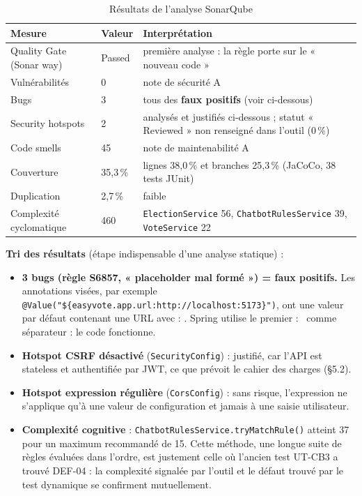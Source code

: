 \documentclass[12pt,a4paper]{report}
\begin{document}
\begin{table}[H]
\centering
\caption{Résultats de l'analyse SonarQube}
\small
\begin{tabularx}{\textwidth}{@{}p{4.4cm}p{2.6cm}X@{}}
\toprule
\rowcolor{evlight}\textbf{Mesure} & \textbf{Valeur} & \textbf{Interprétation}\\
\midrule
Quality Gate (Sonar way) & Passed & première analyse : la règle porte sur le « nouveau code »\\
Vulnérabilités & 0 & note de sécurité A\\
Bugs & 3 & tous des \textbf{faux positifs} (voir ci-dessous)\\
Security hotspots & 2 & analysés et justifiés ci-dessous ; statut « Reviewed » non renseigné dans l'outil (0\,\%)\\
Code smells & 45 & note de maintenabilité A\\
Couverture & 35,3\,\% & lignes 38,0\,\% et branches 25,3\,\% (JaCoCo, 38 tests JUnit)\\
Duplication & 2,7\,\% & faible\\
Complexité cyclomatique & 460 & \texttt{ElectionService} 56, \texttt{ChatbotRulesService} 39, \texttt{VoteService} 22\\
\bottomrule
\end{tabularx}
\end{table}

\textbf{Tri des résultats} (étape indispensable d'une analyse statique) :
\begin{itemize}
  \item \textbf{3 bugs (règle S6857, « placeholder mal formé ») = faux positifs.} Les annotations visées, par exemple \texttt{@Value("\$\{easyvote.app.url:http://localhost:5173\}")}, ont une valeur par défaut contenant une URL avec \og : \fg. Spring utilise le premier \og : \fg\ comme séparateur : le code fonctionne.
  \item \textbf{Hotspot \og CSRF désactivé \fg} (\texttt{SecurityConfig}) : justifié, car l'API est stateless et authentifiée par JWT, ce que prévoit le cahier des charges (§5.2).
  \item \textbf{Hotspot \og expression régulière \fg} (\texttt{CorsConfig}) : sans risque, l'expression ne s'applique qu'à une valeur de configuration et jamais à une saisie utilisateur.
  \item \textbf{Complexité cognitive} : \texttt{ChatbotRulesService.tryMatchRule()} atteint 37 pour un maximum recommandé de 15. Cette méthode, une longue suite de règles évaluées dans l'ordre, est justement celle où l'ancien test UT-CB3 a trouvé DEF-04 : la complexité signalée par l'outil et le défaut trouvé par le test dynamique se confirment mutuellement.
\end{itemize}
\end{document}
